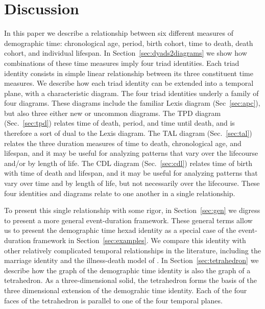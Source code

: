 \documentclass[12pt,oneside,a4paper]{article} %
\theoremstyle{definition}
\begin{document}
\section{Discussion}

In this paper we describe a relationship between six different measures of
demographic time: chronological age, period, birth cohort, time to death, death
cohort, and individual lifespan. In Section~\ref{sec:dyads2diagrams} we show how
combinations of these time measures imply four triad identities. Each
triad identity consists in simple linear relationship between its three
constituent time measures. We describe how each triad identity can be
extended into a temporal plane, with a characteristic diagram. The four triad
identities underly a family of four diagrams. These diagrams include the
familiar Lexis diagram (Sec~\ref{sec:apc}), but also three either new or
uncommon diagrams.
The TPD diagram (Sec.~\ref{sec:tpd}) relates time of death, period, and time
until death, and is therefore a sort of dual to the Lexis diagram. The TAL
diagram (Sec.~\ref{sec:tal}) relates the three duration measures of time to
death, chronological age, and lifespan, and it may be useful for analyzing patterns that vary over the lifecourse and/or by length of life.
The CDL diagram (Sec.~\ref{sec:cdl}) relates time of birth with time of death
and lifespan, and it may be useful for analyzing patterns that vary over time and by length of life,
but not necessarily over the lifecourse. These four identities and diagrams
relate to one another in a single relationship.

To present this single relationship with some rigor, in Section~\ref{sec:gen} we
digress to present a more general event-duration framework. These general terms
allow us to present the demographic time hexad identity as a special case of the
event-duration framework in Section~\ref{sec:examples}.
We compare this identity with other relatively complicated temporal
relationships in the literature, including the \citet{lexis1875einleitung}
marriage identity and the illness-death model of \citet{brinks}. In
Section~\ref{sec:tetrahedron} we describe how the graph of the demographic time identity is also the graph of a tetrahedron. As a
three-dimensional solid, the tetrahedron forms the basis of the three
dimensional extension of the demograhic time identity. Each of the four
faces of the tetrahedron is parallel to one of the four temporal planes.
\end{document}
